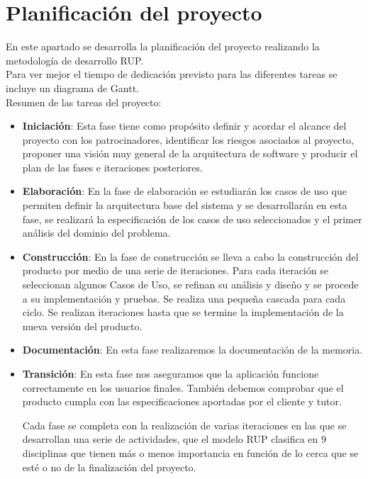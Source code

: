 \section{Planificación del proyecto}
En este apartado se desarrolla la planificación del proyecto realizando la metodología de desarrollo RUP.\\
Para ver mejor el tiempo de dedicación previsto para las diferentes tareas se incluye un diagrama de Gantt.\\
Resumen de las tareas del proyecto:\\
\begin{itemize}
 \item \textbf{Iniciación}: Esta fase tiene como propósito definir y acordar el alcance del proyecto con los patrocinadores, identificar los riesgos asociados al proyecto, proponer una visión muy general de la arquitectura de software y producir el plan de las fases e iteraciones posteriores.

 \item \textbf{Elaboración}: En la fase de elaboración se estudiarán los casos de uso que permiten definir la arquitectura base del sistema y se desarrollarán en esta fase, se realizará la especificación de los casos de uso seleccionados y el primer análisis del dominio del problema.

\item \textbf{Construcción}: En la fase de construcción se lleva a cabo la construcción del producto por medio de una serie de iteraciones.
Para cada iteración se seleccionan algunos Casos de Uso, se refinan su análisis y diseño y se procede a su implementación y pruebas. Se realiza una pequeña cascada para cada ciclo. Se realizan iteraciones hasta que se termine la implementación de la nueva versión del producto.

 \item \textbf{Documentación}: En esta fase realizaremos la documentación de la memoria.

 \item \textbf{Transición}: En esta fase nos aseguramos que la aplicación funcione correctamente en los usuarios finales. También debemos comprobar que el producto cumpla con las especificaciones aportadas por el cliente y tutor.

Cada fase se completa con la realización de varias iteraciones en las que se desarrollan una serie de actividades, que el modelo RUP clasifica en 9 disciplinas que tienen más o menos importancia en función de lo cerca que se esté o no de la finalización del proyecto.


\end{itemize}
